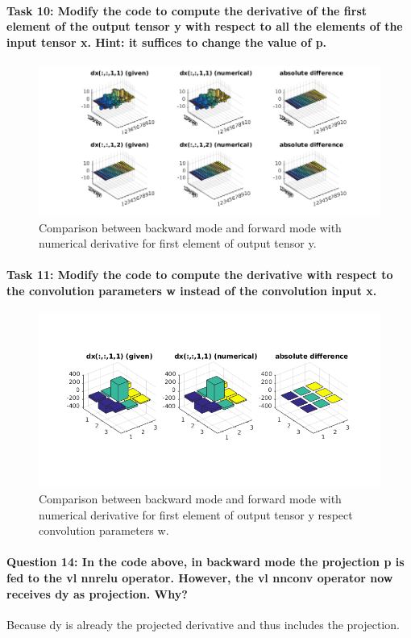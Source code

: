 \documentclass[12pt]{article}
\begin{document}
\paragraph{Task 10: Modify the code to compute the derivative of the first element of the output tensor y with respect to all the elements of the input tensor x. Hint: it suffices to change the value of p.}
\begin{figure}[htbp]
 \centering
 \includegraphics[width=\textwidth]{21b}
 \caption{Comparison between backward mode and forward mode with numerical derivative for first element of output tensor y.}
 \label{fig:21b}
\end{figure}
\paragraph{Task 11: Modify the code to compute the derivative with respect to the convolution parameters w instead of the convolution input x.}
\begin{figure}[htbp]
 \centering
\includegraphics[width=\textwidth]{21c}
 \caption{Comparison between backward mode and forward mode with numerical derivative for first element of output tensor y respect convolution parameters w.}
 \label{fig:21c}
\end{figure}
\paragraph{Question 14: In the code above, in backward mode the projection p is fed to the vl nnrelu operator. However,	the vl nnconv operator now receives dy as projection. Why?} Because dy is already the projected derivative and thus includes the projection.
\end{document}
